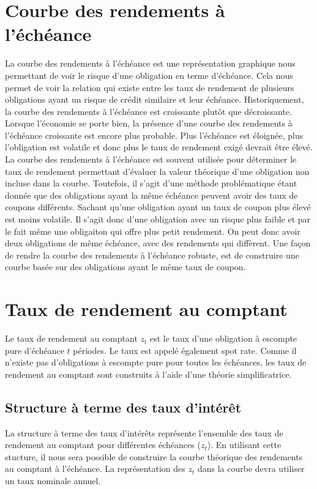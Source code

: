 \documentclass[12pt]{article}
\begin{document}
\section{ Courbe des rendements à l’échéance}
La courbe des rendements à l'échéance est une représentation graphique nous permettant de voir le risque d'une obligation en terme d'échéance.  Cela nous permet de voir la relation qui existe entre les taux de rendement de plusieurs obligations ayant un risque de crédit similaire et leur échéance.  Historiquement,  la courbe des rendements à l’échéance est croissante plutôt que décroissante.  Lorsque l'économie se porte bien,  la présence d'une courbe des rendements à l’échéance croissante est encore plus probable.  Plus l’échéance est éloignée,  plus l’obligation est volatile et donc plus le taux de rendement exigé devrait être élevé.  La courbe des rendements à l'échéance est souvent utilisée pour déterminer le taux de rendement permettant d’évaluer la valeur théorique d’une obligation non incluse dans la courbe.  Toutefois,  il s'agit d'une méthode problématique étant donnée que des obligations ayant la même échéance peuvent avoir des taux de coupons différents.  Sachant qu'une obligation ayant un taux de coupon plus élevé est moins volatile.  Il s'agit donc d'une obligation avec un risque plus faible et par le fait même une obligaiton qui offre plus petit rendement.   On peut donc avoir deux obligations de même échéance,  avec des rendements qui diffèrent. Une  façon de rendre la courbe des rendements à l'échéance robuste,  est de construire une courbe basée sur des obligations ayant le même taux de coupon.
\section{Taux de rendement au comptant}
Le taux de rendement au comptant $z_t$ est le taux d’une obligation à escompte pure d’échéance $t$ périodes.  Le taux est appelé également spot rate.  Comme il n’existe pas d’obligations à escompte pure pour toutes les échéances,  les taux de rendement au comptant sont construits à l’aide d’une théorie simplificatrice.
\subsection{Structure à terme des taux d’intérêt}
La structure à terme des taux d'intérêts représente l'ensemble des taux de rendement au comptant pour différentes échéances ($z_t$).  En utilisant cette stucture,  il nous sera possible de construire la courbe théorique des rendements au comptant à l’échéance.  La représentation des $z_t$ dans la courbe devra utiliser un taux nominale annuel.
\newpage
\end{document}
